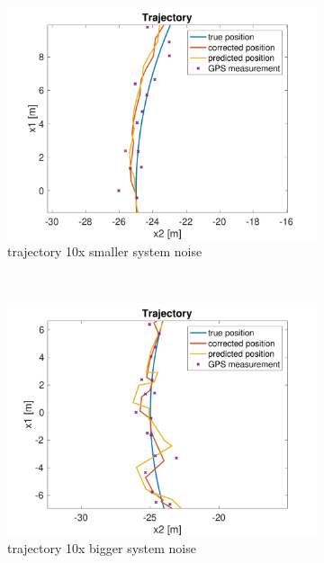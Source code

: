\documentclass{article}
\begin{document}
\begin{figure}[H]
    \centering
    \begin{subfigure}[t]{0.49\textwidth}
        \centering
        \includegraphics[width=\textwidth]{dt1_smaller_motion_noise/traj_zoom}
        \caption{trajectory 10x smaller system noise}
    \end{subfigure}
    ~
    \begin{subfigure}[t]{0.49\textwidth}
        \centering
        \includegraphics[width=\textwidth]{dt1_bigger_motion_noise/traj_zoom}
        \caption{trajectory 10x bigger system noise}
    \end{subfigure}
    ~
    \begin{subfigure}[t]{0.49\textwidth}

\end{subfigure}
\end{figure}
\end{document}
